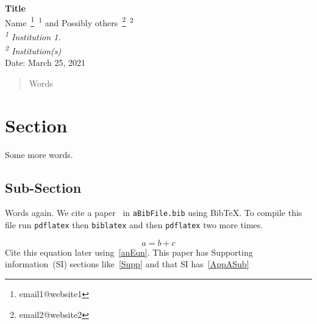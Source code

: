 



\begin{center}
{\bf Title} \bsk\\
    Name~\footnote{email1@website1}~\textsuperscript{1} 
    and Possibly others~\footnote{email2@website2}~\textsuperscript{2}\\
{\em \textsuperscript{1} Institution 1.}\\
{\em \textsuperscript{2} Institution(s)}\\
Date: March 25, 2021
\end{center}

\begin{abstract}
Words
\end{abstract}

\section{Section}
\label{Label1}
\xb
{}
\xa

Some more words.

\subsection{Sub-Section}
\label{Label2}
\xb
{}
\xa

Words again. We cite a paper~\cite{AuthorYear} in {\tt aBibFile.bib} using
BibTeX. To compile this file run {\tt pdflatex} then {\tt biblatex} and
then {\tt pdflatex} two more times.

\begin{equation}
    a = b + c
    \label{anEqn}
\end{equation}
%
Cite this equation later using~\eqref{anEqn}. This paper has Supporting
information~(SI) sections like~\ref{Supp} and that SI has~\ref{AppASub}







